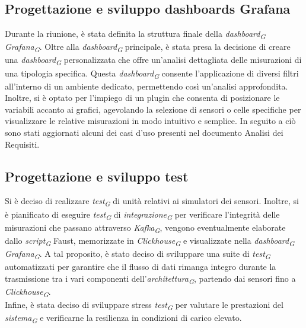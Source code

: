 \documentclass{article}
\begin{document}
    \subsection{Progettazione e sviluppo dashboards Grafana}
    Durante la riunione, è stata definita la struttura finale della \textit{dashboard}\textsubscript{\textit{G}} \textit{Grafana}\textsubscript{\textit{G}}. Oltre alla \textit{dashboard}\textsubscript{\textit{G}} principale, è stata presa la decisione di creare una \textit{dashboard}\textsubscript{\textit{G}} personalizzata che offre un'analisi dettagliata delle misurazioni di una tipologia specifica. Questa \textit{dashboard}\textsubscript{\textit{G}} consente l'applicazione di diversi filtri all'interno di un ambiente dedicato, permettendo così un'analisi approfondita. \\
    Inoltre, si è optato per l'impiego di un plugin che consenta di posizionare le variabili accanto ai grafici, agevolando la selezione di sensori o celle specifiche per visualizzare le relative misurazioni in modo intuitivo e semplice. In seguito a ciò sono stati aggiornati alcuni dei casi d’uso presenti nel documento Analisi dei Requisiti.

    \subsection{Progettazione e sviluppo test}
    Si è deciso di realizzare \textit{test}\textsubscript{\textit{G}} di unità relativi ai simulatori dei sensori. Inoltre, si è pianificato di eseguire \textit{test}\textsubscript{\textit{G}} di \textit{integrazione}\textsubscript{\textit{G}} per verificare l'integrità delle misurazioni che passano attraverso \textit{Kafka}\textsubscript{\textit{G}}, vengono eventualmente elaborate dallo \textit{script}\textsubscript{\textit{G}} Faust, memorizzate in \textit{Clickhouse}\textsubscript{\textit{G}} e visualizzate nella \textit{dashboard}\textsubscript{\textit{G}} \textit{Grafana}\textsubscript{\textit{G}}. A tal proposito, è stato deciso di sviluppare una suite di \textit{test}\textsubscript{\textit{G}} automatizzati per garantire che il flusso di dati rimanga integro durante la trasmissione tra i vari componenti dell'\textit{architettura}\textsubscript{\textit{G}}, partendo dai sensori fino a \textit{Clickhouse}\textsubscript{\textit{G}}. \\
    Infine, è stata deciso di sviluppare stress \textit{test}\textsubscript{\textit{G}} per valutare le prestazioni del \textit{sistema}\textsubscript{\textit{G}} e verificarne la resilienza in condizioni di carico elevato.
\end{document}
